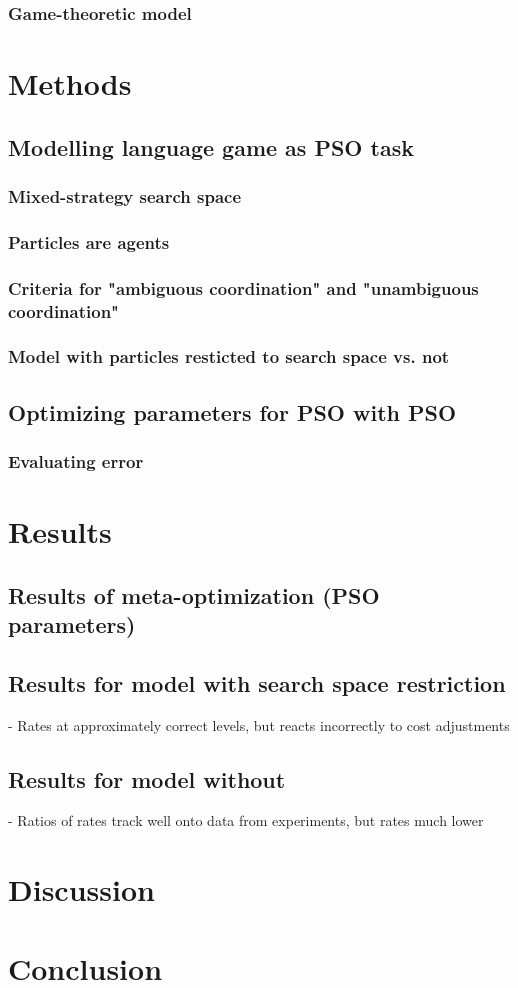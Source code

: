 \documentclass[12pt]{article}
\begin{document}
\subsubsection{Game-theoretic model}


\section{Methods}
\subsection{Modelling language game as PSO task}
\subsubsection{Mixed-strategy search space}
\subsubsection{Particles are agents}
\subsubsection{Criteria for "ambiguous coordination" and "unambiguous coordination"}
\subsubsection{Model with particles resticted to search space vs. not}

\subsection{Optimizing parameters for PSO with PSO}
\subsubsection{Evaluating error}

\section{Results}
\subsection{Results of meta-optimization (PSO parameters)}
\subsection{Results for model with search space restriction}
- Rates at approximately correct levels, but reacts incorrectly to cost adjustments
\subsection{Results for model without}
- Ratios of rates track well onto data from experiments, but rates much lower


\section{Discussion}



\section{Conclusion}
\end{document}
